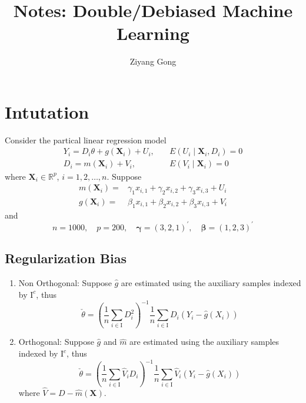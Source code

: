 \documentclass[en,mtpro2]{elegantpaper}
\title{Notes: Double/Debiased Machine Learning}
\author{Ziyang Gong}
\begin{document}
\maketitle

\section{Intutation}

Consider the partical linear regression model
\begin{equation}
    \begin{aligned}
        Y_{i}=D_{i}\theta+g(\mathbf{X}_{i})+U_{i}, & \quad E\left(U_{i}\mid\mathbf{X}_{i},D_{i}\right)=0 \\
        D_{i}=m(\mathbf{X}_{i})+V_{i},             & \quad E\left(V_{i}\mid\mathbf{X}_{i}\right)=0
    \end{aligned}
\end{equation}
where $\mathbf{X}_{i}\in\mathbb{R}^{p}$, $i=1,2,\ldots,n$. Suppose
\begin{equation}
    \begin{aligned}
        m(\mathbf{X}_{i})= & \gamma_{1}x_{i,1}+\gamma_{2}x_{i,2}+\gamma_{3}x_{i,3}+U_{i} \\
        g(\mathbf{X}_{i})= & \beta_{1}x_{i,1}+\beta_{2}x_{i,2}+\beta_{3}x_{i,3}+V_{i}
    \end{aligned}
\end{equation}
and
\begin{equation*}
    n=1000,\quad p=200,\quad\boldsymbol{\gamma}=\left(3,2,1\right)^{\prime},\quad\boldsymbol{\beta}=\left(1,2,3\right)^{\prime}
\end{equation*}

\subsection{Regularization Bias}

\begin{enumerate}
    \item Non Orthogonal: Suppose $\hat{g}$ are estimated using the auxiliary samples indexed by $\mathrm{I}^{c}$, thus
          \begin{equation}
              \check{\theta}=\left(\frac{1}{n}\sum_{i\in\mathrm{I}}D_{i}^{2}\right)^{-1}\frac{1}{n}\sum_{i\in\mathrm{I}}D_{i}\left(Y_{i}-\hat{g}\left(X_{i}\right)\right)
          \end{equation}
    \item Orthogonal:  Suppose $\hat{g}$ and $\hat{m}$ are estimated using the auxiliary samples indexed by $\mathrm{I}^{c}$, thus
          \begin{equation}
              \check{\theta}=\left(\frac{1}{n}\sum_{i\in\mathrm{I}}\widehat{V}_{i}D_{i}\right)^{-1}\frac{1}{n}\sum_{i\in\mathrm{I}}\hat{V}_{i}\left(Y_{i}-\hat{g}\left(X_{i}\right)\right)
          \end{equation}
          where $\hat{V}=D-\hat{m}(\mathbf{X})$.
\end{enumerate}
\end{document}
